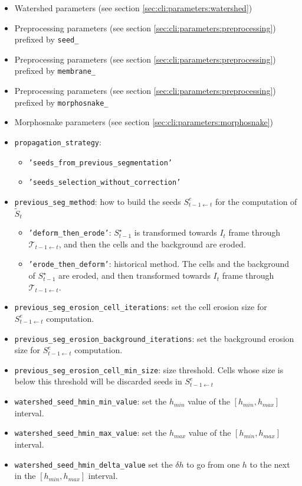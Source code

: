 \begin{itemize}
\itemsep -0.5ex
\item Watershed parameters 
  (see section \ref{sec:cli:parameters:watershed})
\item Preprocessing parameters
  (see section \ref{sec:cli:parameters:preprocessing})
  prefixed by \texttt{seed\_}
\item Preprocessing parameters
  (see section \ref{sec:cli:parameters:preprocessing})
  prefixed by \texttt{membrane\_}
\item Preprocessing parameters
  (see section \ref{sec:cli:parameters:preprocessing})
  prefixed by \texttt{morphosnake\_}
\item Morphosnake parameters
  (see section \ref{sec:cli:parameters:morphosnake})
\item \texttt{propagation\_strategy}:
  \begin{itemize}
  \item \texttt{'seeds\_from\_previous\_segmentation'}
  \item \texttt{'seeds\_selection\_without\_correction'}
  \end{itemize}
\item \texttt{previous\_seg\_method}:
  how to build the seeds $S^e_{t-1 \leftarrow t}$ 
  for the computation of $\tilde{S}_{t}$
  \begin{itemize}
  \item \texttt{'deform\_then\_erode'}: $S^{\star}_{t-1}$ is transformed
  towards $I_t$ frame through $\mathcal{T}_{t-1 \leftarrow t}$, and then
  the cells and the background  are eroded.
  \item \texttt{'erode\_then\_deform'}: historical method. The cells 
  and the background of $S^{\star}_{t-1}$ are eroded, and then transformed
  towards $I_t$ frame through $\mathcal{T}_{t-1 \leftarrow t}$.
  \end{itemize}
\item \texttt{previous\_seg\_erosion\_cell\_iterations}:
  set the cell erosion size for $S^e_{t-1 \leftarrow t}$ computation. 
\item \texttt{previous\_seg\_erosion\_background\_iterations}:
  set the background erosion size for $S^e_{t-1 \leftarrow t}$ computation. 
\item \texttt{previous\_seg\_erosion\_cell\_min\_size}:
  size threshold. Cells whose size is below this threshold will 
  be discarded seeds in $S^e_{t-1 \leftarrow t}$ 

\item \texttt{watershed\_seed\_hmin\_min\_value}:
  set the $h_{min}$ value of the $[h_{min}, h_{max}]$ interval.
\item \texttt{watershed\_seed\_hmin\_max\_value}:
  set the $h_{max}$ value of the $[h_{min}, h_{max}]$ interval.
\item \texttt{watershed\_seed\_hmin\_delta\_value}
  set the $\delta h$ to go from one $h$ to the next in the 
  $[h_{min}, h_{max}]$ interval.
  

\end{itemize}
